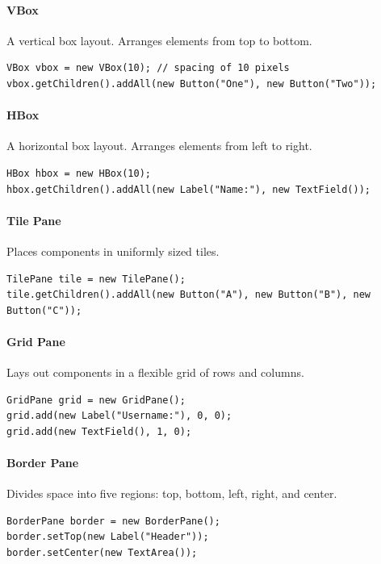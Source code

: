 \documentclass{article}
\begin{document}
\paragraph{\textbf{VBox}}

A vertical box layout. Arranges elements from top to bottom.
\begin{verbatim}
VBox vbox = new VBox(10); // spacing of 10 pixels
vbox.getChildren().addAll(new Button("One"), new Button("Two"));
\end{verbatim}

\paragraph{\textbf{HBox}}

A horizontal box layout. Arranges elements from left to right.
\begin{verbatim}
HBox hbox = new HBox(10);
hbox.getChildren().addAll(new Label("Name:"), new TextField());
\end{verbatim}

\paragraph{\textbf{Tile Pane}}

Places components in uniformly sized tiles.
\begin{verbatim}
TilePane tile = new TilePane();
tile.getChildren().addAll(new Button("A"), new Button("B"), new Button("C"));
\end{verbatim}

\paragraph{\textbf{Grid Pane}}

Lays out components in a flexible grid of rows and columns.
\begin{verbatim}
GridPane grid = new GridPane();
grid.add(new Label("Username:"), 0, 0);
grid.add(new TextField(), 1, 0);
\end{verbatim}

\paragraph{\textbf{Border Pane}}

Divides space into five regions: top, bottom, left, right, and center.
\begin{verbatim}
BorderPane border = new BorderPane();
border.setTop(new Label("Header"));
border.setCenter(new TextArea());
\end{verbatim}
\end{document}
